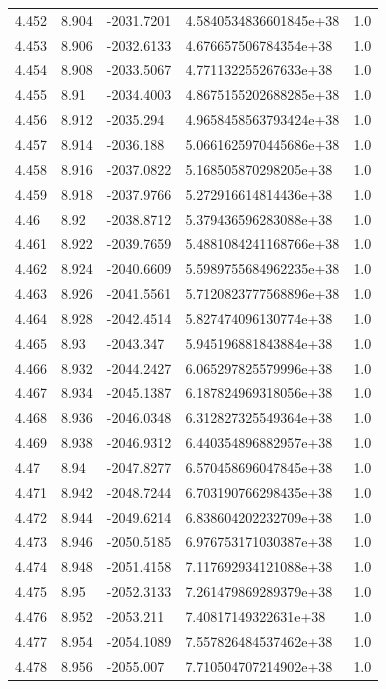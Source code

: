 \begin{tabular}{lllll}
4.452 & 8.904 & -2031.7201 & 4.5840534836601845e+38 & 1.0 \\
4.453 & 8.906 & -2032.6133 & 4.676657506784354e+38 & 1.0 \\
4.454 & 8.908 & -2033.5067 & 4.771132255267633e+38 & 1.0 \\
4.455 & 8.91 & -2034.4003 & 4.8675155202688285e+38 & 1.0 \\
4.456 & 8.912 & -2035.294 & 4.9658458563793424e+38 & 1.0 \\
4.457 & 8.914 & -2036.188 & 5.0661625970445686e+38 & 1.0 \\
4.458 & 8.916 & -2037.0822 & 5.168505870298205e+38 & 1.0 \\
4.459 & 8.918 & -2037.9766 & 5.272916614814436e+38 & 1.0 \\
4.46 & 8.92 & -2038.8712 & 5.379436596283088e+38 & 1.0 \\
4.461 & 8.922 & -2039.7659 & 5.4881084241168766e+38 & 1.0 \\
4.462 & 8.924 & -2040.6609 & 5.5989755684962235e+38 & 1.0 \\
4.463 & 8.926 & -2041.5561 & 5.7120823777568896e+38 & 1.0 \\
4.464 & 8.928 & -2042.4514 & 5.827474096130774e+38 & 1.0 \\
4.465 & 8.93 & -2043.347 & 5.945196881843884e+38 & 1.0 \\
4.466 & 8.932 & -2044.2427 & 6.065297825579996e+38 & 1.0 \\
4.467 & 8.934 & -2045.1387 & 6.187824969318056e+38 & 1.0 \\
4.468 & 8.936 & -2046.0348 & 6.312827325549364e+38 & 1.0 \\
4.469 & 8.938 & -2046.9312 & 6.440354896882957e+38 & 1.0 \\
4.47 & 8.94 & -2047.8277 & 6.570458696047845e+38 & 1.0 \\
4.471 & 8.942 & -2048.7244 & 6.703190766298435e+38 & 1.0 \\
4.472 & 8.944 & -2049.6214 & 6.838604202232709e+38 & 1.0 \\
4.473 & 8.946 & -2050.5185 & 6.976753171030387e+38 & 1.0 \\
4.474 & 8.948 & -2051.4158 & 7.117692934121088e+38 & 1.0 \\
4.475 & 8.95 & -2052.3133 & 7.261479869289379e+38 & 1.0 \\
4.476 & 8.952 & -2053.211 & 7.40817149322631e+38 & 1.0 \\
4.477 & 8.954 & -2054.1089 & 7.557826484537462e+38 & 1.0 \\
4.478 & 8.956 & -2055.007 & 7.710504707214902e+38 & 1.0 \\

\end{tabular}
